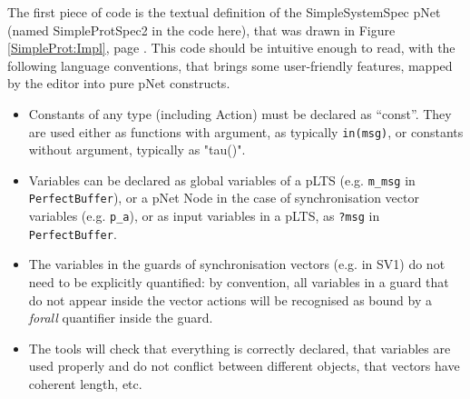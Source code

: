 \documentclass{lmcs}
\newcommand{\TODO}[1]{\textcolor{red}{\textbf{[TODO:#1]}}}
\begin{document}


  

The first piece of code is the textual definition of the SimpleSystemSpec
pNet (named SimpleProtSpec2 in the code here), that was drawn in Figure \ref{SimpleProt:Impl}, page \pageref{SimpleProt:Impl}. This code should be intuitive enough to read, with the following
language conventions, that brings some user-friendly features, mapped by the editor into pure pNet constructs.

\begin{itemize}
  \item Constants of any type (including Action) must be declared as
    ``const''. They are used either as functions with argument, as
    typically \texttt{in(msg)}, or constants without argument, typically as "tau()".
  \item Variables can be declared as global variables of a pLTS (e.g. \texttt{m\_msg} in \texttt{PerfectBuffer}), or a pNet Node in the case of synchronisation vector variables (e.g. \texttt{p\_a}),
    or as input variables in a pLTS, as \texttt{?msg} in \texttt{PerfectBuffer}.
  \item The variables in the guards of synchronisation vectors (e.g. in SV1) do not need to be explicitly quantified: by convention, all variables in a guard that do not appear inside the vector actions will be recognised as bound by a \emph{forall} quantifier inside the guard.
    \item The tools will check that everything is correctly declared, that variables are used properly and do not conflict between different objects, that vectors have coherent length, etc.
\end{itemize}
\bigskip
\end{document}
